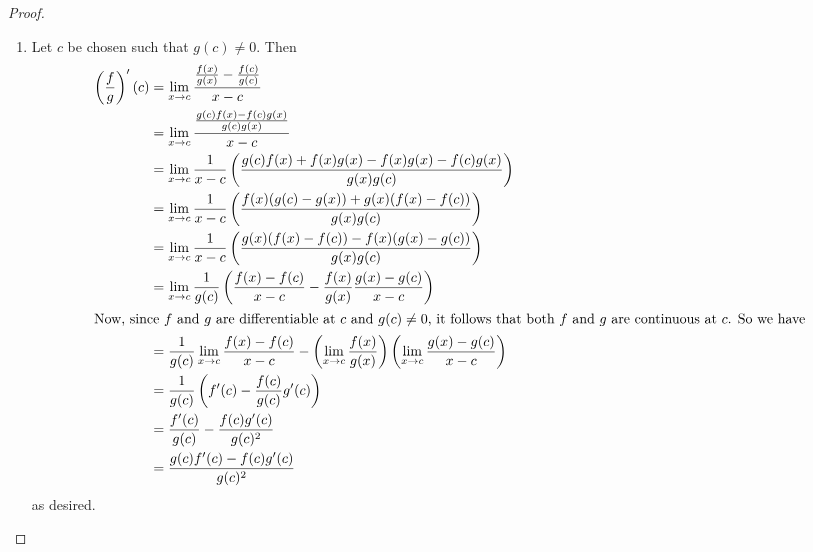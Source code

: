 \begin{enumerate}
\begin{proof}
\begin{enumerate}
        \item Let \( c \) be chosen such that \( g(c) \neq 0 \). Then
        \begin{align*} 
            \left( \frac{f}{g} \right)'(c) &= \lim_{x \rightarrow c} \frac{\frac{f(x)}{g(x)}- \frac{f(c)}{g(c)}}{x-c} \\
            &= \lim_{x \rightarrow c} \frac{\frac{g(c)f(x) - f(c)g(x)}{g(c)g(x)}}{x-c} \\
            &= \lim_{x \rightarrow c} \frac{1}{x-c}\left( \frac{g(c)f(x) + f(x)g(x) - f(x)g(x) - f(c)g(x)}{g(x)g(c)} \right) \\
            &= \lim_{x \rightarrow c} \frac{1}{x-c} \left( \frac{f(x)(g(c)-g(x)) + g(x)(f(x) - f(c))}{g(x)g(c)} \right) \\
            &= \lim_{x \rightarrow c} \frac{1}{x-c} \left( \frac{ g(x)(f(x) - f(c))-f(x)(g(x)-g(c))}{g(x)g(c)} \right) \\
            &= \lim_{x \rightarrow c} \frac{1}{g(c)} \left( \frac{f(x)-f(c)}{x-c} - \frac{f(x)}{g(x)}\frac{g(x)-g(c)}{x-c} \right) \\
            \intertext{Now, since \( f \) and \( g \) are differentiable at \( c \) and \( g(c) \neq 0 \), it follows that both \( f \) and \( g \) are continuous at \( c \). So we have}
            &= \frac{1}{g(c)}\lim_{x \rightarrow c} \frac{f(x)-f(c)}{x-c} - \left( \lim_{x \rightarrow c} \frac{f(x)}{g(x)} \right) \left(\lim_{x \rightarrow c} \frac{g(x)-g(c)}{x-c}\right) \\
            &= \frac{1}{g(c)} \left( f'(c) - \frac{f(c)}{g(c)}g'(c) \right) \\
            &= \frac{f'(c)}{g(c)} - \frac{f(c)g'(c)}{g(c)^{2}} \\
            &= \frac{g(c)f'(c) - f(c)g'(c)}{g(c)^{2}}
        \end{align*}
        as desired.
    \end{enumerate}
    \end{proof}
    

\end{enumerate}

